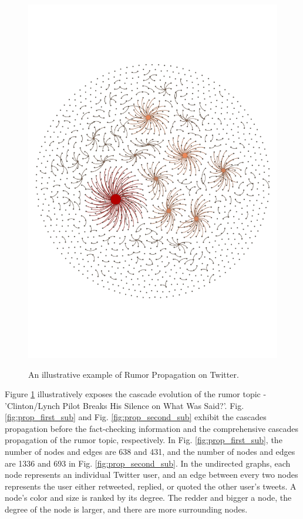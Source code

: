 \documentclass[conference]{IEEEtran}
\begin{document}
\begin{figure}[htp]
		{\includegraphics[scale=0.33]{figures/all.pdf}
			\label{fig:prop_second_sub}}
		\caption{An illustrative example of Rumor Propagation on Twitter.}
		\label{fig:propagation}
		\vspace{-3mm}
	\end{figure}
	
	Figure \ref{fig:propagation} illustratively exposes the cascade evolution of the rumor topic - 'Clinton/Lynch Pilot Breaks His Silence on What Was Said?'. Fig. \ref{fig:prop_first_sub} and Fig. \ref{fig:prop_second_sub} exhibit the cascades propagation before the fact-checking information and the comprehensive cascades propagation of the rumor topic, respectively. In Fig. \ref{fig:prop_first_sub}, the number of nodes and edges are 638 and 431, and the number of nodes and edges are 1336 and 693 in Fig. \ref{fig:prop_second_sub}. In the undirected graphs, each node represents an individual Twitter user, and an edge between every two nodes represents the user either retweeted, replied, or quoted the other user's tweets. A node's color and size is ranked by its degree. The redder and bigger a node, the degree of the node is larger, and there are more surrounding nodes. 
	
\end{document}

